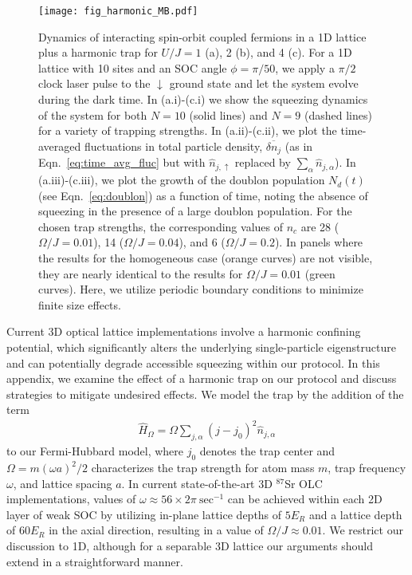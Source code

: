 \documentclass{nature}
\renewcommand{\t}{\text} %
\begin{document}
\begin{spacing}{1}
\begin{figure}
    \texttt{[image: fig\_harmonic\_MB.pdf]}
    \label{fig:harmonic_trap_MB1}
    \caption{Dynamics of interacting spin-orbit  coupled fermions in a 1D lattice plus a harmonic trap for $U/J = 1$ (a), 2 (b), and 4 (c). For a 1D lattice with 10 sites and an SOC angle $\phi = \pi/50$, we apply a $\pi/2$ clock laser pulse to the $\downarrow$ ground state and let the system evolve during the dark time. In (a.i)-(c.i) we show the squeezing dynamics of the system for both $N = 10$ (solid lines) and $N = 9$ (dashed lines) for a variety of trapping strengths. In (a.ii)-(c.ii), we plot the time-averaged fluctuations in total particle density, $\overline{\delta n_j}$ (as in Eqn.~\eqref{eq:time_avg_fluc} but with $\hat{n}_{j,\uparrow}$ replaced by $\sum_{\alpha}\hat{n}_{j,\alpha}$). In (a.iii)-(c.iii), we plot the growth of the doublon population $N_d(t)$ (see Eqn.~\eqref{eq:doublon}) as a function of time, noting the absence of squeezing in the presence of a large doublon population. For the chosen trap strengths, the corresponding values of $n_c$ are 28 ($\Omega/J = 0.01$), 14 ($\Omega/J = 0.04$), and 6 ($\Omega/J = 0.2$). In panels where the results for the homogeneous case (orange curves) are not visible, they are nearly identical to the results for $\Omega/J = 0.01$ (green curves). Here, we utilize periodic boundary conditions to minimize finite size effects.}
    \label{fig:harmonic_trap_MB}
\end{figure}
\end{spacing}

Current 3D optical lattice implementations involve a harmonic confining potential, which significantly alters the underlying single-particle eigenstructure and can potentially degrade accessible squeezing within our protocol. In this appendix, we examine the effect of a harmonic trap on our protocol and discuss strategies to mitigate undesired effects. We model the trap by the addition of the term
\begin{align}
  \hat{H}_{\Omega}
  = \Omega\sum_{j,\alpha}(j-j_0)^2\hat{n}_{j,\alpha}
\end{align}
to our Fermi-Hubbard model, where $j_0$ denotes the trap center and $\Omega = m(\omega a)^2/2$ characterizes the trap strength for atom mass $m$, trap frequency $\omega$, and lattice spacing $a$. In current state-of-the-art 3D $^{87}$Sr OLC implementations, values of $\omega \approx 56 \times 2\pi~\t{sec}^{-1}$ can be achieved within each 2D layer of weak SOC by utilizing in-plane lattice depths of $5 E_R$ and a lattice depth of $60 E_R$ in the axial direction, resulting in a value of $\Omega/J \approx 0.01$. We restrict our discussion to 1D, although for a separable 3D lattice our arguments should extend in a straightforward manner.
\end{document}
